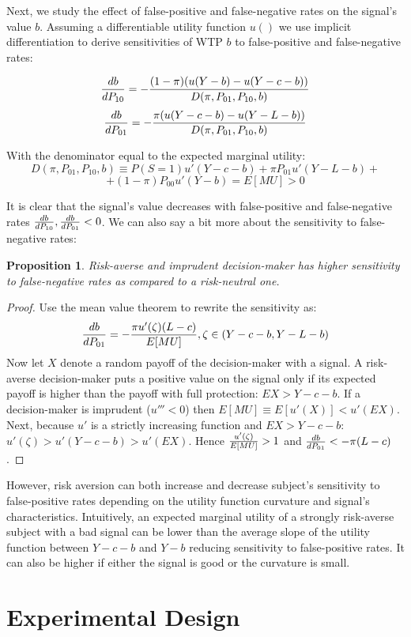 \documentclass[12pt,a4paper]{article}
\newtheorem{theorem}{Proposition}
\begin{document}
Next, we study the effect of false-positive and false-negative rates on the signal's value $b$. Assuming a differentiable utility function $u()$ we use implicit differentiation to derive sensitivities of WTP $b$ to false-positive and false-negative rates:

$${db\over dP_{10}}=-{(1-\pi)(u(Y-b)-u(Y-c-b))\over D(\pi, P_{01}, P_{10}, b)}$$
$${db\over dP_{01}}=-{\pi(u(Y-c-b)-u(Y-L-b))\over D(\pi, P_{01}, P_{10}, b)}$$

With the denominator equal to the expected marginal utility:
$$D(\pi, P_{01}, P_{10}, b)\equiv P(S=1)u'(Y-c-b)+\pi P_{01}u'(Y-L-b)+$$
$$+(1-\pi)P_{00}u'(Y-b)=E[MU]>0$$

It is clear that the signal's value decreases with false-positive and false-negative rates ${db\over dP_{10}},{db\over dP_{01}}<0$. We can also say a bit more about the sensitivity to false-negative rates:
\begin{theorem}
Risk-averse and imprudent decision-maker has higher sensitivity to false-negative rates as compared to a risk-neutral one.
\end{theorem} 
\begin{proof}
Use the mean value theorem to rewrite the sensitivity as:
$${db\over dP_{01}}=-{\pi u'(\zeta)(L-c)\over E[MU]},\zeta \in \left(Y-c-b, Y-L-b\right)$$
Now let $X$ denote a random payoff of the decision-maker with a signal. A risk-averse decision-maker puts a positive value on the signal only if its expected payoff is higher than the payoff with full protection: $EX>Y-c-b$. If a decision-maker is imprudent ($u'''<0$) then $E[MU]\equiv E[u'(X)]<u'(EX)$. Next, because $u'$ is a strictly increasing function and $EX>Y-c-b$: $u'(\zeta)>u'(Y-c-b)>u'(EX)$. Hence ${u'(\zeta)\over E[MU]}>1$ and ${db\over dP_{01}}<-\pi(L-c)$. 
\end{proof}


However, risk aversion can both increase and decrease subject's sensitivity to false-positive rates depending on the utility function curvature and signal's characteristics. Intuitively, an expected marginal utility of a strongly risk-averse subject with a bad signal can be lower than the average slope of the utility function between $Y-c-b$ and $Y-b$ reducing sensitivity to false-positive rates. It can also be higher if either the signal is good or the curvature is small. 

\vspace{20pt}

\section{Experimental Design}
\end{document}
